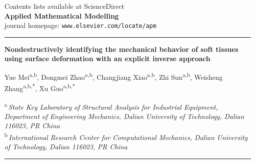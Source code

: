 \documentclass[11pt]{article}
\begin{document}
\noindent
{\footnotesize Contents lists available at ScienceDirect}\\[2pt]
{\Large\bfseries Applied Mathematical Modelling}\\[2pt]
{\footnotesize journal homepage: \texttt{www.elsevier.com/locate/apm}}

\vspace{0.8em}
\hrule
\vspace{1em}

{\large\bfseries
Nondestructively identifying the mechanical behavior of soft
tissues using surface deformation with an explicit inverse
approach\par}

\vspace{0.8em}

\noindent
Yue Mei\textsuperscript{a,b},
Dongmei Zhao\textsuperscript{a,b},
Changjiang Xiao\textsuperscript{a,b},
Zhi Sun\textsuperscript{a,b},
Weisheng Zhang\textsuperscript{a,b,*},
Xu Guo\textsuperscript{a,b,*}

\vspace{0.5em}

\noindent
{\footnotesize
\textsuperscript{a}\,\emph{State Key Laboratory of Structural Analysis
for Industrial Equipment, Department of Engineering Mechanics, Dalian
University of Technology, Dalian 116023, PR China}\\[2pt]
\textsuperscript{b}\,\emph{International Research Center for
Computational Mechanics, Dalian University of Technology, Dalian
116023, PR China}\par}

\vspace{1em}
\hrule
\vspace{1em}
\end{document}
